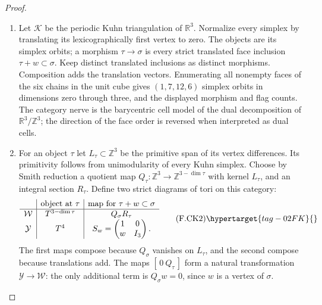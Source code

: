 \begin{proof}
\begin{enumerate}[label={$\langle1\rangle$\arabic*.}]
\item Let $\mathcal K$ be the periodic Kuhn triangulation of
$\mathbb R^3$.  Normalize every simplex by translating its
lexicographically first vertex to zero.  The objects are its
simplex orbits; a morphism $\tau\to\sigma$ is every strict
translated face inclusion $\tau+w\subset\sigma$.
Keep distinct translated inclusions as distinct morphisms.
Composition adds the translation vectors.  Enumerating all
nonempty faces of the six chains in the unit cube gives
$(1,7,12,6)$ simplex orbits in dimensions zero through three,
and the displayed morphism and flag counts.  The category
nerve is the barycentric cell model of the dual decomposition
of $\mathbb R^3/\mathbb Z^3$; the direction of the face order
is reversed when interpreted as dual cells.

\item For an object $\tau$ let $L_\tau\subset\mathbb Z^3$ be the
primitive span of its vertex differences.  Its primitivity
follows from unimodularity of every Kuhn simplex.  Choose by
Smith reduction a quotient map
$Q_\tau:\mathbb Z^3\to\mathbb Z^{3-\dim\tau}$ with kernel
$L_\tau$, and an integral section $R_\tau$.
Define two strict diagrams of tori on this category:
\[
\begin{array}{c|c|c}
 &\text{object at }\tau&\text{map for }\tau+w\subset\sigma\\\hline
\mathcal W&T^{3-\dim\tau}&Q_\sigma R_\tau\\
\mathcal Y&T^4&S_w=\begin{pmatrix}1&0\\ w&I_3\end{pmatrix}.
\end{array}                                                \tag{F.CK2}\hypertarget{tag-02FK}{}\label{maps:eq:F.CK2}
\]
The first maps compose because $Q_\sigma$ vanishes on
$L_\tau$, and the second compose because translations add.
The maps $[\,0\ Q_\tau\,]$ form a natural transformation
$\mathcal Y\to\mathcal W$: the only additional term is
$Q_\sigma w=0$, since $w$ is a vertex of $\sigma$.


\end{enumerate}
\end{proof}
